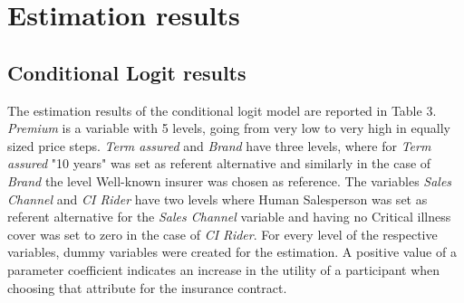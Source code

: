 \documentclass[12pt, abstracton]{article}
\begin{document}
\section{Estimation results}
\subsection{Conditional Logit results}
\label{cond_logit_results}
The estimation results of the conditional logit model are reported in Table 3. \textit{Premium} is a variable with 5 levels, going from very low to very high in equally sized price steps. \textit{Term assured} and \textit{Brand} have three levels, where for \textit{Term assured} "10 years" was set as referent alternative and similarly in the case of \textit{Brand} the level Well-known insurer was chosen as reference. The variables \textit{Sales Channel} and \textit{CI Rider} have two levels where Human Salesperson was set as referent alternative for the \textit{Sales Channel} variable and having no Critical illness cover was set to zero in the case of \textit{CI Rider}. For every level of the respective variables, dummy variables were created for the estimation. A positive value of a parameter coefficient indicates an increase in the utility of a participant when choosing that attribute for the insurance contract.\\
\end{document}
